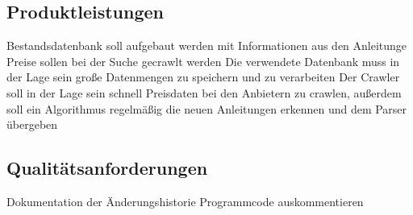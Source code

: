 \subsection{Produktleistungen}
Bestandsdatenbank soll aufgebaut werden mit Informationen aus den Anleitunge \newline
Preise sollen bei der Suche gecrawlt werden \newline
Die verwendete Datenbank muss in der Lage sein große Datenmengen zu speichern und zu verarbeiten \newline
Der Crawler soll in der Lage sein schnell Preisdaten bei den Anbietern zu crawlen, außerdem soll ein Algorithmus regelmäßig die neuen Anleitungen erkennen und dem Parser übergeben \newline

\subsection{Qualitätsanforderungen}
Dokumentation der Änderungshistorie \newline
Programmcode auskommentieren \newline

